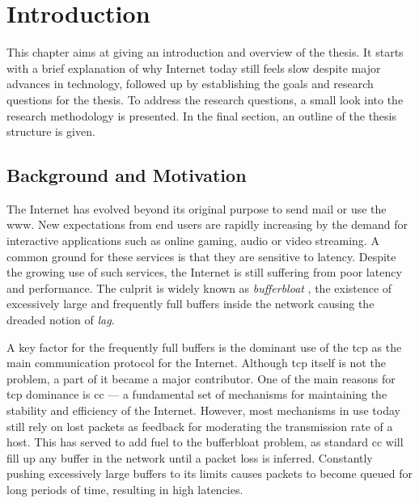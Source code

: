\chapter{Introduction}

This chapter aims at giving an introduction and overview of the thesis. It starts with a brief explanation of why Internet today still feels slow despite major advances in technology, followed up by establishing the goals and research questions for the thesis. To address the research questions, a small look into the research methodology is presented. In the final section, an outline of the thesis structure is given.









\section{Background and Motivation}

The Internet has evolved beyond its original purpose to send mail or use the \gls{www}. New expectations from end users are rapidly increasing by the demand for interactive applications such as online gaming, audio or video streaming. A common ground for these services is that they are sensitive to latency. Despite the growing use of such services, the Internet is still suffering from poor latency and performance. The culprit is widely known as \textit{bufferbloat} \cite{bufferbloat}, the existence of excessively large and frequently full buffers inside the network causing the dreaded notion of \textit{lag}.

A key factor for the frequently full buffers is the dominant use of the \gls{tcp} as the main communication protocol for the Internet. Although \gls{tcp} itself is not the problem, a part of it became a major contributor. One of the main reasons for \gls{tcp} dominance is \gls{cc} --- a fundamental set of mechanisms for maintaining the stability and efficiency of the Internet. \cite{rfc6077} However, most mechanisms in use today still rely on lost packets as feedback for moderating the transmission rate of a host. This has served to add fuel to the bufferbloat problem, as standard \gls{cc} will fill up any buffer in the network until a packet loss is inferred. Constantly pushing excessively large buffers to its limits causes packets to become queued for long periods of time, resulting in high latencies.

